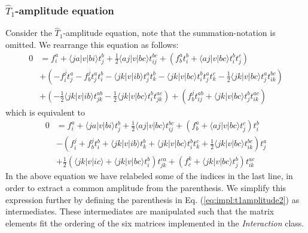 \subsubsection{\bf $\hat{T}_1$-amplitude equation}
Consider the $\hat{T}_1$-amplitude equation, note that the summation-notation is omitted. We rearrange this equation as follows:
\begin{align}
0&=f_i^a+ \langle ja|v|bi \rangle t_{j}^{b}+\frac{1}{2}\langle aj|v|bc\rangle t_{ij}^{bc}+\left( f_{b}^{a}t_{i}^{b}+\langle aj|v|bc\rangle t_i^bt_j^c\right )\nonumber\\
&+\left(-f_{i}^{j}t_{j}^{a}-f_b^jt_j^at_i^b-\langle jk|v|ib\rangle t_{j}^{a}t_{k}^{b}-\langle jk|v|bc\rangle t_i^bt_j^at_k^c-\frac{1}{2}\langle jk|v|bc\rangle t_j^at_{ik}^{bc} \right)\nonumber\\
&+\left(-\frac{1}{2}\langle jk|v|ib\rangle t_{jk}^{ab}-\frac{1}{2}\langle jk|v|bc\rangle t_i^bt_{jk}^{ac} \right)+ \left(f_{b}^{j}t_{ij}^{ab}+\langle jk|v|bc\rangle t_j^bt_{ik}^{ac}\right)
\label{eq:impl:t1amplitude1}
\end{align}
which is equivalent to
\begin{align}
0&=f_i^a+ \langle ja|v|bi \rangle t_{j}^{b}+\frac{1}{2}\langle aj|v|bc\rangle t_{ij}^{bc}+\left( f_{b}^{a}+\langle aj|v|bc\rangle t_j^c\right )t_i^b\nonumber\\
&-\left(f_{i}^{j}+f_b^jt_i^b+\langle jk|v|ib\rangle t_{k}^{b}+\langle jk|v|bc\rangle t_i^bt_k^c+\frac{1}{2}\langle jk|v|bc\rangle t_{ik}^{bc} \right)t_{j}^{a}\nonumber\\
&+\frac{1}{2}\left(\langle jk|v|ic\rangle +\langle jk|v|bc\rangle t_i^b\right)t_{jk}^{ca} + \left(f_{c}^{k}+\langle jk|v|bc\rangle t_j^b\right)t_{ik}^{ac}
\label{eq:impl:t1amplitude2}
\end{align}
In the above equation we have relabeled some of the indices in the last line, in order to extract a common amplitude from the parenthesis. We simplify this expression further by defining the parenthesis in Eq. (\ref{eq:impl:t1amplitude2}) as intermediates. These intermediates are manipulated such that the matrix elements fit the ordering of the six matrices implemented in the \emph{Interaction} class.
